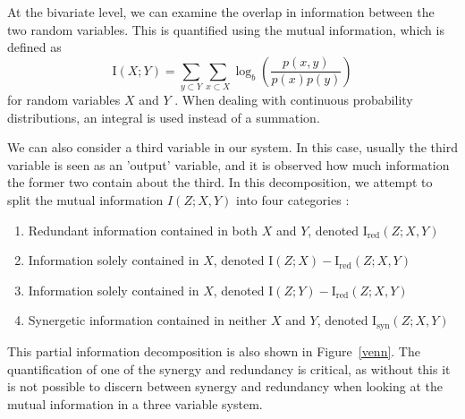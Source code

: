 \documentclass[../main.tex]{subfiles}
\begin{document}
At the bivariate level, we can examine the overlap in information between the two random variables.
This is quantified using the mutual information, which is defined as 
%
\begin{equation}
\mathrm{I}(X;Y) = \sum_{y \subset Y} \sum_{x \subset X} \log_b (\frac{p(x,y)}{p(x) p(y)})
\end{equation}
%
for random variables $X$ and $Y$ \cite{cover2012elements}.
When dealing with continuous probability distributions, an integral is used instead of a summation.

We can also consider a third variable in our system.
In this case, usually the third variable is seen as an 'output' variable, and it is observed how much information the former two contain about the third.
In this decomposition, we attempt to split the mutual information $I(Z;X,Y)$ into four categories \cite{williams2010nonnegative}:
%
\begin{enumerate}
\item Redundant information contained in both $X$ and $Y$, denoted $\mathrm{I}_\mathrm{red}(Z;X,Y)$
\item Information solely contained in $X$, denoted $\mathrm{I}(Z; X) - \mathrm{I}_\mathrm{red}(Z;X,Y)$
\item Information solely contained in $X$, denoted $\mathrm{I}(Z; Y) - \mathrm{I}_\mathrm{red}(Z;X,Y)$
\item Synergetic information contained in neither $X$ and $Y$, denoted $\mathrm{I}_\mathrm{syn}(Z;X,Y)$
\end{enumerate}
This partial information decomposition is also shown in Figure~\ref{venn}.
The quantification of one of the synergy and redundancy is critical, as without this it is not possible to discern between synergy and redundancy when looking at the mutual information in a three variable system.

\def\firstcircle{(0:-0.9cm) circle (2cm)}
\def\secondcircle{(0:0cm) circle (3cm)}
\def\thirdcircle{(0:0.9cm) circle (2cm)}
\end{document}
